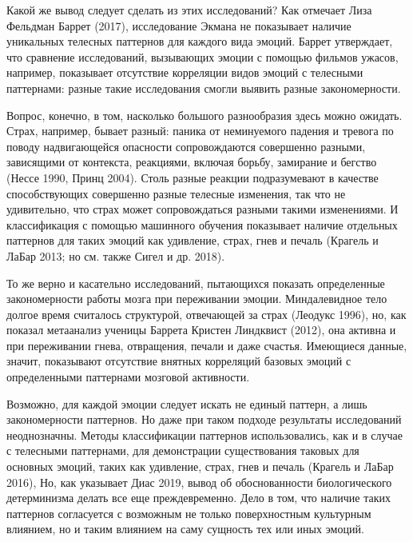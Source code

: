 \documentclass[11pt]{book}
\begin{document}
Какой же вывод следует сделать из этих исследований? Как отмечает Лиза Фельдман Баррет (2017), исследование Экмана не показывает наличие уникальных телесных паттернов для каждого вида эмоций. Баррет утверждает, что сравнение исследований, вызывающих эмоции с помощью фильмов ужасов, например, показывает отсутствие корреляции видов эмоций с телесными паттернами: разные такие исследования смогли выявить разные закономерности.

Вопрос, конечно, в том, насколько большого разнообразия здесь можно ожидать. Страх, например, бывает разный: паника от неминуемого падения и тревога по поводу надвигающейся опасности сопровождаются совершенно разными, зависящими от контекста, реакциями, включая борьбу, замирание и бегство (Нессе 1990, Принц 2004). Столь разные реакции подразумевают в качестве способствующих совершенно разные телесные изменения, так что не удивительно, что страх может сопровождаться разными такими изменениями. И классификация с помощью машинного обучения показывает наличие отдельных паттернов для таких эмоций как удивление, страх, гнев и печаль (Крагель и ЛаБар 2013; но см. также Сигел и др. 2018).

То же верно и касательно исследований, пытающихся показать определенные закономерности работы мозга при переживании эмоции. Миндалевидное тело долгое время считалось структурой, отвечающей за страх (Леодукс 1996), но, как показал метаанализ ученицы Баррета Кристен Линдквист (2012), она активна и при переживании гнева, отвращения, печали и даже счастья. Имеющиеся данные, значит, показывают отсутствие внятных корреляций базовых эмоций с определенными паттернами мозговой активности.

Возможно, для каждой эмоции следует искать не единый паттерн, а лишь закономерности паттернов. Но даже при таком подходе результаты исследований неоднозначны. Методы классификации паттернов использовались, как и в случае с телесными паттернами, для демонстрации существования таковых для основных эмоций, таких как удивление, страх, гнев и печаль (Крагель и ЛаБар 2016), Но, как указывает Диас 2019, вывод об обоснованности биологического детерминизма делать все еще преждевременно. Дело в том, что наличие таких паттернов согласуется с возможным не только поверхностным культурным влиянием, но и таким влиянием на саму сущность тех или иных эмоций.
\end{document}
